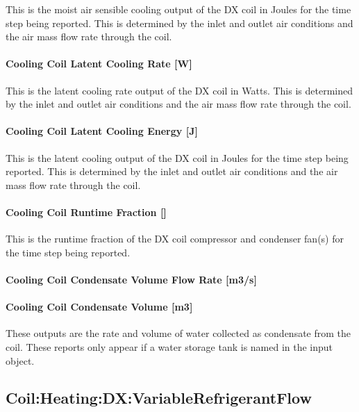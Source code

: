 This is the moist air sensible cooling output of the DX coil in Joules for the time step being reported. This is determined by the inlet and outlet air conditions and the air mass flow rate through the coil.

\paragraph{Cooling Coil Latent Cooling Rate {[}W{]}}\label{cooling-coil-latent-cooling-rate-w}

This is the latent cooling rate output of the DX coil in Watts. This is determined by the inlet and outlet air conditions and the air mass flow rate through the coil.

\paragraph{Cooling Coil Latent Cooling Energy {[}J{]}}\label{cooling-coil-latent-cooling-energy-j}

This is the latent cooling output of the DX coil in Joules for the time step being reported. This is determined by the inlet and outlet air conditions and the air mass flow rate through the coil.

\paragraph{Cooling Coil Runtime Fraction {[]}}\label{cooling-coil-runtime-fraction}

This is the runtime fraction of the DX coil compressor and condenser fan(s) for the time step being reported.

\paragraph{Cooling Coil Condensate Volume Flow Rate {[}m3/s{]}}\label{cooling-coil-condensate-volume-flow-rate-m3s-1}

\paragraph{Cooling Coil Condensate Volume {[}m3{]}}\label{cooling-coil-condensate-volume-m3-1}

These outputs are the rate and volume of water collected as condensate from the coil. These reports only appear if a water storage tank is named in the input object.

\subsection{Coil:Heating:DX:VariableRefrigerantFlow}\label{coilheatingdxvariablerefrigerantflow}

